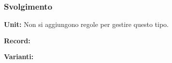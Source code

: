 \subsubsection*{Svolgimento}

\textbf{Unit:} 
Non si aggiungono regole per gestire questo tipo.

\textbf{Record:} 

\begin{prooftree}    
\end{prooftree} 

\textbf{Varianti:} 

\begin{prooftree}    
\end{prooftree}

\begin{prooftree}    
\end{prooftree}  


